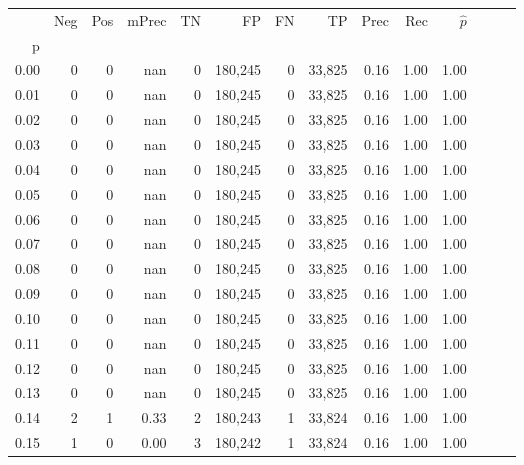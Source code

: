 \begin{tabular}{rrrrrrrrrrrrrr}
\toprule
{} &    Neg &    Pos & mPrec &       TN &       FP &      FN &      TP &  Prec &   Rec & $\hat{p}$ \\
p    &        &        &       &          &          &         &         &       &       &           \\
\midrule
0.00 &      0 &      0 &   nan &        0 &  180,245 &       0 &  33,825 &  0.16 &  1.00 &      1.00 \\
0.01 &      0 &      0 &   nan &        0 &  180,245 &       0 &  33,825 &  0.16 &  1.00 &      1.00 \\
0.02 &      0 &      0 &   nan &        0 &  180,245 &       0 &  33,825 &  0.16 &  1.00 &      1.00 \\
0.03 &      0 &      0 &   nan &        0 &  180,245 &       0 &  33,825 &  0.16 &  1.00 &      1.00 \\
0.04 &      0 &      0 &   nan &        0 &  180,245 &       0 &  33,825 &  0.16 &  1.00 &      1.00 \\
0.05 &      0 &      0 &   nan &        0 &  180,245 &       0 &  33,825 &  0.16 &  1.00 &      1.00 \\
0.06 &      0 &      0 &   nan &        0 &  180,245 &       0 &  33,825 &  0.16 &  1.00 &      1.00 \\
0.07 &      0 &      0 &   nan &        0 &  180,245 &       0 &  33,825 &  0.16 &  1.00 &      1.00 \\
0.08 &      0 &      0 &   nan &        0 &  180,245 &       0 &  33,825 &  0.16 &  1.00 &      1.00 \\
0.09 &      0 &      0 &   nan &        0 &  180,245 &       0 &  33,825 &  0.16 &  1.00 &      1.00 \\
0.10 &      0 &      0 &   nan &        0 &  180,245 &       0 &  33,825 &  0.16 &  1.00 &      1.00 \\
0.11 &      0 &      0 &   nan &        0 &  180,245 &       0 &  33,825 &  0.16 &  1.00 &      1.00 \\
0.12 &      0 &      0 &   nan &        0 &  180,245 &       0 &  33,825 &  0.16 &  1.00 &      1.00 \\
0.13 &      0 &      0 &   nan &        0 &  180,245 &       0 &  33,825 &  0.16 &  1.00 &      1.00 \\
0.14 &      2 &      1 &  0.33 &        2 &  180,243 &       1 &  33,824 &  0.16 &  1.00 &      1.00 \\
0.15 &      1 &      0 &  0.00 &        3 &  180,242 &       1 &  33,824 &  0.16 &  1.00 &      1.00 \\

\end{tabular}
